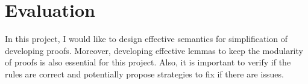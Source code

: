 \documentclass[]{article}
\begin{document}
\section{Evaluation}
In this project, I would like to design effective semantics for simplification of developing proofs. 
Moreover, developing effective lemmas to keep the modularity of proofs is also essential for this 
project. Also, it is important to verify if the rules are correct and potentially propose strategies 
to fix if there are issues.

\printbibliography
\end{document}
